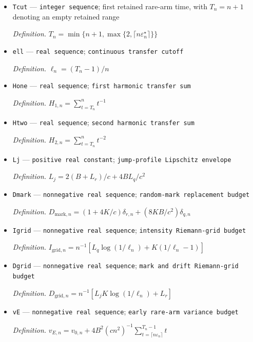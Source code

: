 \documentclass{article}
\begin{document}
\begin{itemize}
  \par\smallskip\noindent\emph{Definition.} \(\varepsilon_n^{\star}=\max\{\varepsilon_n,\delta_{q,n},n^{-1/2}\}\)
  \item \texttt{Tcut} --- \texttt{integer sequence}; first retained rare-arm time, with \(T_n=n+1\) denoting an empty retained range
  \par\smallskip\noindent\emph{Definition.} \(T_n=\min\{n+1,\max\{2,\lceil n\varepsilon_n^{\star}\rceil\}\}\)
  \item \texttt{ell} --- \texttt{real sequence}; \texttt{continuous transfer cutoff}
  \par\smallskip\noindent\emph{Definition.} \(\ell_n=(T_n-1)/n\)
  \item \texttt{Hone} --- \texttt{real sequence}; \texttt{first harmonic transfer sum}
  \par\smallskip\noindent\emph{Definition.} \(H_{1,n}=\sum_{t=T_n}^{n}t^{-1}\)
  \item \texttt{Htwo} --- \texttt{real sequence}; \texttt{second harmonic transfer sum}
  \par\smallskip\noindent\emph{Definition.} \(H_{2,n}=\sum_{t=T_n}^{n}t^{-2}\)
  \item \texttt{Lj} --- \texttt{positive real constant}; \texttt{jump-\allowbreak{}profile Lipschitz envelope}
  \par\smallskip\noindent\emph{Definition.} \(L_j=2(B+L_r)/c+4BL_q/c^2\)
  \item \texttt{Dmark} --- \texttt{nonnegative real sequence}; \texttt{random-\allowbreak{}mark replacement budget}
  \par\smallskip\noindent\emph{Definition.} \(D_{\mathrm{mark},n}=(1+4K/c)\delta_{r,n}+(8KB/c^2)\delta_{q,n}\)
  \item \texttt{Igrid} --- \texttt{nonnegative real sequence}; \texttt{intensity Riemann-\allowbreak{}grid budget}
  \par\smallskip\noindent\emph{Definition.} \(I_{\mathrm{grid},n}=n^{-1}[L_q\log(1/\ell_n)+K(1/\ell_n-1)]\)
  \item \texttt{Dgrid} --- \texttt{nonnegative real sequence}; \texttt{mark and drift Riemann-\allowbreak{}grid budget}
  \par\smallskip\noindent\emph{Definition.} \(D_{\mathrm{grid},n}=n^{-1}[L_jK\log(1/\ell_n)+L_r]\)
  \item \texttt{vE} --- \texttt{nonnegative real sequence}; \texttt{early rare-\allowbreak{}arm variance budget}
  \par\smallskip\noindent\emph{Definition.} \(v_{E,n}=v_{0,n}+4B^2(cn^2)^{-1}\sum_{t=\lceil n\varepsilon_n\rceil}^{T_n-1}t\)

\end{itemize}
\end{document}
